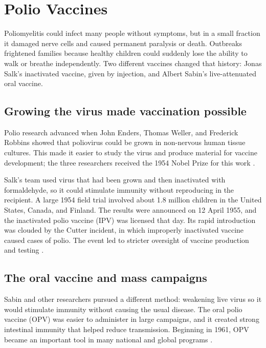 \documentclass[12pt,oneside]{book}
\begin{document}
\chapter[Polio Vaccines]{Polio Vaccines}

Poliomyelitis could infect many people without symptoms, but in a small
fraction it damaged nerve cells and caused permanent paralysis or death.
Outbreaks frightened families because healthy children could suddenly lose
the ability to walk or breathe independently. Two different vaccines
changed that history: Jonas Salk's inactivated vaccine, given by injection,
and Albert Sabin's live-attenuated oral vaccine.

\section{Growing the virus made vaccination possible}
Polio research advanced when John Enders, Thomas Weller, and Frederick
Robbins showed that poliovirus could be grown in non-nervous human tissue
cultures. This made it easier to study the virus and produce material for
vaccine development; the three researchers received the 1954 Nobel Prize
for this work \cite{whoPolioHistory,cdcPolioChapter}.

Salk's team used virus that had been grown and then inactivated with
formaldehyde, so it could stimulate immunity without reproducing in the
recipient. A large 1954 field trial involved about 1.8 million children in
the United States, Canada, and Finland. The results were announced on 12
April 1955, and the inactivated polio vaccine (IPV) was licensed that day.
Its rapid introduction was clouded by the Cutter incident, in which
improperly inactivated vaccine caused cases of polio. The event led to
stricter oversight of vaccine production and testing
\cite{whoPolioHistory,cdcPolioChapter,cdcVaccineSafetyHistory}.

\section{The oral vaccine and mass campaigns}
Sabin and other researchers pursued a different method: weakening live
virus so it would stimulate immunity without causing the usual disease. The
oral polio vaccine (OPV) was easier to administer in large campaigns, and
it created strong intestinal immunity that helped reduce transmission.
Beginning in 1961, OPV became an important tool in many national and global
programs \cite{whoPolioHistory,cdcPolioChapter}.
\end{document}
